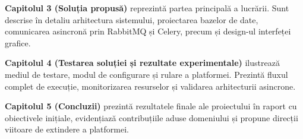 \textbf{Capitolul 3 (Soluția propusă)} reprezintă partea principală a lucrării. Sunt descrise în detaliu arhitectura sistemului, proiectarea bazelor de date, comunicarea asincronă prin RabbitMQ și Celery, precum și design-ul interfeței grafice.

\textbf{Capitolul 4 (Testarea soluției și rezultate experimentale)} ilustrează mediul de testare, modul de configurare și rulare a platformei. Prezintă fluxul complet de execuție, monitorizarea resurselor și validarea arhitecturii asincrone.

\textbf{Capitolul 5 (Concluzii)} prezintă rezultatele finale ale proiectului în raport cu obiectivele inițiale, evidențiază contribuțiile aduse domeniului și propune direcții viitoare de extindere a platformei.